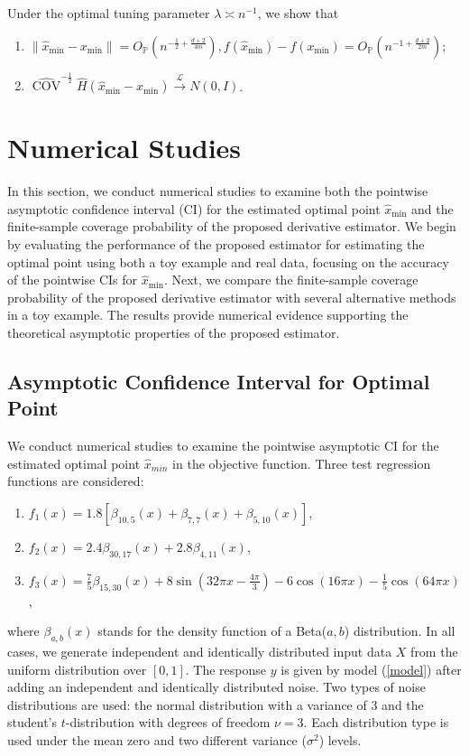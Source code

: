 \documentclass[12pt]{article}
\theoremstyle{plain}
\theoremstyle{remark}
\begin{document}
Under the optimal tuning parameter $\lambda\asymp n^{-1}$, we show that
    \begin{enumerate}
        \item $\|\hat{x}_{\min}-x_{\min}\|=O_\mathbb{P}(n^{-\frac{1}{2}+\frac{d+2}{4m}}),f(\hat{x}_{\min})-f(x_{\min})=O_\mathbb{P}(n^{-1+\frac{d+2}{2m}})$;
        \item $\widehat{\operatorname{COV}}^{-\frac{1}{2}}\hat{H}(\hat{x}_{\min}-x_{\min})\xrightarrow{\mathscr{L}} N(0,I)$.
    \end{enumerate}


\section{Numerical Studies}\label{sec:NS}

In this section, we conduct numerical studies to examine both the pointwise asymptotic confidence interval (CI) for the estimated optimal point $\hat{x}_{\min}$ and the finite-sample coverage probability of the proposed derivative estimator. We begin by evaluating the performance of the proposed estimator for estimating the optimal point using both a toy example and real data, focusing on the accuracy of the pointwise CIs for $\hat{x}_{\min}$.
Next, we compare the finite-sample coverage probability of the proposed derivative estimator with several alternative methods in a toy example. The results provide numerical evidence supporting the theoretical asymptotic properties of the proposed estimator.


\subsection{Asymptotic Confidence Interval for Optimal Point}\label{subsection:optimal_point}
We conduct numerical studies to examine the pointwise asymptotic CI for the estimated optimal point $\hat{x}_{min}$ in the objective function. Three test regression functions are considered:
\begin{enumerate}
 \setlength\itemsep{3mm}
 \item $f_{1}(x)=1.8[\beta_{10,5}(x)+\beta_{7,7}(x)+\beta_{5,10}(x)]$,
 \item $f_{2}(x)=2.4\beta_{30,17}(x)+2.8\beta_{4,11}(x)$,
\item $f_{3}(x)=\frac{7}{5}\beta_{15,30}(x)+8\sin(32\pi x -\frac{4\pi}{3})-6\cos(16\pi x)-\frac{1}{5}\cos(64\pi x)$,
\end{enumerate}
where $\beta_{a,b}(x)$ stands for the density function of a Beta($a,b$) distribution. In all cases, we generate independent and identically distributed input data $X$ from the uniform distribution over $[0,1]$. The response $y$ is given by model (\ref{model}) after adding an independent and identically distributed noise. Two types of noise distributions are used: the normal distribution with a variance of 3 and the student's $t$-distribution with degrees of freedom $\nu=3$. Each distribution type is used under the mean zero and two different variance ($\sigma^2$) levels.  
\end{document}
